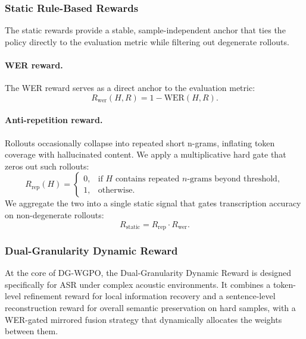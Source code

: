 \documentclass{article}
\begin{document}
\subsubsection{Static Rule-Based Rewards}
\vspace{-1mm}
The static rewards provide a stable, sample-independent anchor that ties the policy directly to the evaluation metric while filtering out degenerate rollouts.
\paragraph{WER reward.} The WER reward serves as a direct anchor to the evaluation metric:
\begin{equation}
R_\text{wer}(H, R) = 1 - \text{WER}(H, R).
\end{equation}
\paragraph{Anti-repetition reward.} Rollouts occasionally collapse into repeated short n-grams, inflating token coverage with hallucinated content. We apply a multiplicative hard gate that zeros out such rollouts:
\begin{equation}
R_\text{rep}(H) = 
\begin{cases}
0, & \text{if } H \text{ contains repeated $n$-grams beyond threshold}, \\
1, & \text{otherwise}.
\end{cases}
\end{equation}
We aggregate the two into a single static signal that gates transcription accuracy on non-degenerate rollouts:
\begin{equation}
R_\text{static} = R_\text{rep} \cdot R_\text{wer}.
\end{equation}


\vspace{-1mm}
\subsubsection{Dual-Granularity Dynamic Reward}
\vspace{-1mm}
At the core of DG-WGPO, the Dual-Granularity Dynamic Reward is designed specifically for ASR under complex acoustic environments. It combines a token-level refinement reward for local information recovery and a sentence-level reconstruction reward for overall semantic preservation on hard samples, with a WER-gated mirrored fusion strategy that dynamically allocates the weights between them.
\end{document}
